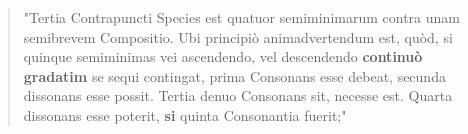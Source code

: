 \begin{quotation}
    "Tertia Contrapuncti Species est quatuor semiminimarum contra unam semibrevem Compositio. Ubi principiò animadvertendum est, quòd, si quinque semiminimas vei ascendendo, vel descendendo \textbf{continuò gradatim} se sequi contingat, prima Consonans esse debeat, secunda dissonans esse possit. Tertia denuo Consonans sit, necesse est. Quarta dissonans esse poterit, \textbf{si} quinta Consonantia fuerit;"
    \label{appen:fuxquinque}
\end{quotation}